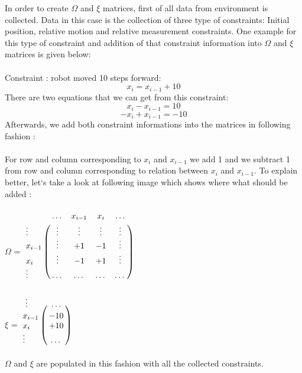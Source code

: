 \documentclass{ba-kecs}
\numberwithin{figure}{section}
\numberwithin{equation}{section}
\begin{document}
In order to create $\Omega$ and $\xi$ matrices, first of all data from environment is collected. Data in this case is the collection of three type of constraints: Initial position, relative motion and relative measurement constraints. One example for this type of constraint and addition of that constraint information into $\Omega$ and $\xi$ matrices is given below:\\ \\
	Constraint : robot moved 10 steps forward: 
	\[ x_{i} = x_{i-1} + 10 \]
	There are two equations that we can get from this constraint:
	\[ x_{i} - x_{i-1} = 10 \]
	\[ -x_{i} + x_{i-1} = -10 \]
	Afterwards, we add both constraint informations into the matrices in following fashion :\\ \\
	For row and column corresponding to $x_{i}$ and $x_{i-1}$ we add 1 and we subtract 1 from row and column corresponding to relation between $x_{i}$ and $x_{i-1}$. To explain better, let`s take a look at following image which shows where what should be added :\\ \\
	$\Omega$ = $\bordermatrix{~ & \dots & x_{i-1} & x_{i} & \dots \cr
							\vdots & \vdots & \vdots & \vdots & \vdots \cr
                  			x_{i-1} & \vdots & +1 & -1 & \vdots \cr
                  			x_{i} & \vdots & -1 & +1 & \vdots \cr
                  			\vdots & \dots & \dots & \dots & \dots \cr}$ \\ \\
                  			
    $\xi$ = $\bordermatrix{~ \vdots & \dots \cr
                  			x_{i-1} & -10 \cr
                  			x_{i}  & +10 \cr
                  			\vdots & \dots \cr}$\\ \\
                  
	$\Omega$ and $\xi$ are populated in this fashion with all the collected constraints.
	
\end{document}
